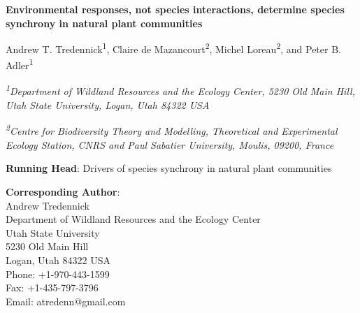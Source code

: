 \documentclass[12pt,]{article}
\title{}
\author{}
\date{}
\begin{document}
\maketitle


\renewcommand\linenumberfont{\normalfont\tiny\sffamily\color{gray}}

\begin{singlespace}

\begin{center}
\large{\textbf{Environmental responses, not species interactions, determine species synchrony in natural plant communities}}

\renewcommand*{\thefootnote}{\fnsymbol{footnote}}

\vspace{1em}

\normalsize{Andrew T. Tredennick\textsuperscript{1}, Claire de Mazancourt\textsuperscript{2}, Michel Loreau\textsuperscript{2}, and Peter B. Adler\textsuperscript{1}}

\vspace{1em}

\textit{\small{\textsuperscript{1}Department of Wildland Resources and the Ecology Center, 5230 Old Main Hill, Utah State University, Logan, Utah 84322 USA}}

\textit{\small{\textsuperscript{2}Centre for Biodiversity Theory and Modelling, Theoretical and Experimental Ecology Station, CNRS and Paul Sabatier University, Moulis, 09200, France}}

\end{center}

\vspace{2em}

\textbf{Running Head}: Drivers of species synchrony in natural plant communities

\textbf{Corresponding Author}: \\
\hspace{2em}Andrew Tredennick \\  
\hspace{2em}Department of Wildland Resources and the Ecology Center\\
\hspace{2em}Utah State University \\
\hspace{2em}5230 Old Main Hill \\
\hspace{2em}Logan, Utah 84322 USA \\
\hspace{2em}Phone: +1-970-443-1599 \\
\hspace{2em}Fax: +1-435-797-3796 \\
\hspace{2em}Email: atredenn@gmail.com

\end{singlespace}\renewcommand*{\thefootnote}{\arabic{footnote}}
\end{document}
